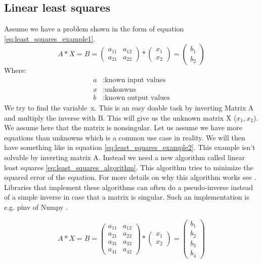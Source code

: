 \documentclass[11pt,a4paper,titlepage,oneside]{report}
\begin{document}
\subsection{Linear least squares}
Assume we have a problem shown in the form of equation \ref{eq:least_squares_example1}.
\begin{equation}\label{eq:least_squares_example1}
  A*X=B=\begin{pmatrix}
    a_{11} & a_{12} \\
    a_{21} & a_{22}
  \end{pmatrix}*
  \begin{pmatrix}
    x_1 \\
    x_2
  \end{pmatrix}=
  \begin{pmatrix}
    b_1 \\
    b_2
  \end{pmatrix}
\end{equation}
Where:
\begin{align*}
  a		  &: \text{known input values}\\
  x	  	&: \text{unkonwns}\\
  b		  &: \text{known output values}
\end{align*}
We try to find the variable x. This is an easy doable task by inverting Matrix A and multiply the inverse with B. This will give us the unknown matrix X ($x_1,x_2$). We assume here that the matrix is nonsingular. Let us assume we have more equations than unknowns which is a common use case in reality. We will then have something like in equation \ref{eq:least_squares_example2}. This example isn't solvable by inverting matrix A. Instead we need a new algorithm called linear least squares \ref{eq:least_squares_algorithm}. This algorithm tries to minimize the squared error of the equation. For more details on why this algorithm works see \cite{Hayes}. Libraries that implement these algorithms can often do a pseudo-inverse instead of a simple inverse in case that a matrix is singular. Such an implementation is e.g. pinv of Numpy \cite{pinv}.

\begin{equation}\label{eq:least_squares_example2}
  A*X=B=\begin{pmatrix}
    a_{11} & a_{12} \\
    a_{21} & a_{22} \\
    a_{31} & a_{32} \\
    a_{41} & a_{42}
  \end{pmatrix}*
  \begin{pmatrix}
    x_1 \\
    x_2
  \end{pmatrix}=
  \begin{pmatrix}
    b_1 \\
    b_2 \\
    b_3 \\
    b_4
  \end{pmatrix}
\end{equation}
\end{document}
